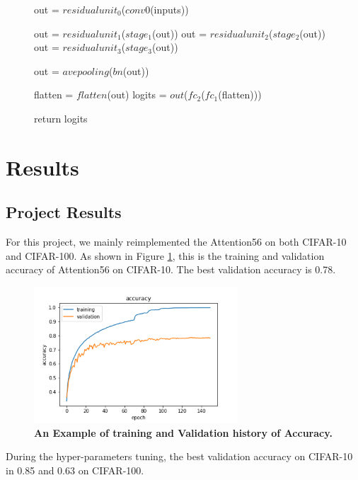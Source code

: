 \documentclass{article}
\newcommand{\mycaption}[2]{\caption[#1]{\textbf{#1.} #2}}
\begin{document}
\begin{multicols}{2}
\begin{figure}[H]
\begin{minipage}{3in}
\begin{algorithm}[H]
\begin{algorithmic}[1]
        \State out = $residualunit_0$($conv0$(inputs))
        
        \State out = $residualunit_1$($stage_1$(out))
        \State out = $residualunit_2$($stage_2$(out))
        \State out = $residualunit_3$($stage_3$(out))

        \State out = $avepooling$($bn$(out))

        \State flatten = $flatten$(out)
        \State logits = $out$($fc_2$($fc_1$(flatten)))
        
        \State return logits
	\EndFunction
\end{algorithmic}
    \end{algorithm}
  \end{minipage}
\end{figure}





\section{Results}
\subsection{Project Results}
For this project, we mainly reimplemented the Attention56 on both CIFAR-10 and CIFAR-100. As shown in Figure \ref{fig:accuracy}, this is the training and validation accuracy of Attention56 on CIFAR-10. The best validation accuracy is 0.78. 
\begin{figure}[H] 
\includegraphics[width=3in]{imgs/accuracy.png}  
\mycaption{An Example of training and Validation history of Accuracy}{}  
\label{fig:accuracy}
\end{figure}

During the hyper-parameters tuning, the best validation accuracy on CIFAR-10 in 0.85 and 0.63 on CIFAR-100.


\end{multicols}
\end{document}
